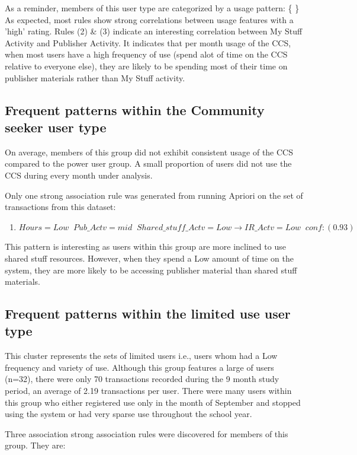\documentclass{acm_proc_article-sp}
\begin{document}
As a reminder, members of this user type  are categorized by a usage pattern: \{ \}
As expected, most rules show strong correlations between usage features with a 'high' rating.
Rules (2) \& (3) indicate an interesting correlation between My Stuff Activity and Publisher Activity. It indicates that per month usage of the CCS, when most users have a high frequency of use (spend alot of time on the CCS relative to everyone else), they are likely to be spending most of their time on publisher materials rather than My Stuff activity.

\subsection {Frequent patterns within the Community seeker user type}
On average, members of this group did not exhibit consistent usage of the CCS compared to the power user group. A small proportion of users did not use the CCS during every month under analysis.

Only one strong association rule was generated from running Apriori on the set of transactions from this dataset:

\begin{enumerate}
\item $Hours=Low \;\; Pub\_Actv=mid \;\; Shared\_stuff\_Actv=Low  \longrightarrow IR\_Actv=Low  \;\;  conf:(0.93)$
\end{enumerate}

This pattern is interesting as users within this group are more inclined to use shared stuff resources. However, when they spend a Low amount of time on the system, they are more likely to be accessing publisher material than shared stuff materials.

\subsection {Frequent patterns within the limited use user type}
This cluster represents the sets of limited users i.e., users whom had a Low frequency and variety of use. 
Although this group features a large of users (n=32), there were only 70 transactions recorded during the 9 month study period, an average of 2.19 transactions per user. There were many users within this group who either registered use only in the month of September and stopped using the system or had very sparse use throughout the school year.

Three association strong association rules were discovered for members of this group. They are:
\end{document}
